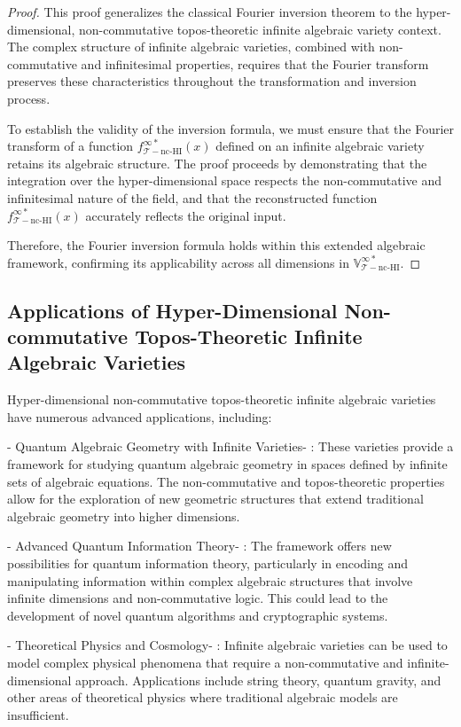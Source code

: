 \documentclass{article}
\begin{document}
\begin{proof}
This proof generalizes the classical Fourier inversion theorem to the hyper-dimensional, non-commutative topos-theoretic infinite algebraic variety context. The complex structure of infinite algebraic varieties, combined with non-commutative and infinitesimal properties, requires that the Fourier transform preserves these characteristics throughout the transformation and inversion process.

To establish the validity of the inversion formula, we must ensure that the Fourier transform of a function \(f_{\mathcal{T}-\text{nc-HI}}^{\infty *}(x)\) defined on an infinite algebraic variety retains its algebraic structure. The proof proceeds by demonstrating that the integration over the hyper-dimensional space respects the non-commutative and infinitesimal nature of the field, and that the reconstructed function \(f_{\mathcal{T}-\text{nc-HI}}^{\infty *}(x)\) accurately reflects the original input.

Therefore, the Fourier inversion formula holds within this extended algebraic framework, confirming its applicability across all dimensions in \(\mathbb{V}_{\mathcal{T}-\text{nc-HI}}^{\infty *}\).
\end{proof}

\subsection{Applications of Hyper-Dimensional Non-commutative Topos-Theoretic Infinite Algebraic Varieties}
Hyper-dimensional non-commutative topos-theoretic infinite algebraic varieties have numerous advanced applications, including:

-  Quantum Algebraic Geometry with Infinite Varieties- : These varieties provide a framework for studying quantum algebraic geometry in spaces defined by infinite sets of algebraic equations. The non-commutative and topos-theoretic properties allow for the exploration of new geometric structures that extend traditional algebraic geometry into higher dimensions.

-  Advanced Quantum Information Theory- : The framework offers new possibilities for quantum information theory, particularly in encoding and manipulating information within complex algebraic structures that involve infinite dimensions and non-commutative logic. This could lead to the development of novel quantum algorithms and cryptographic systems.

-  Theoretical Physics and Cosmology- : Infinite algebraic varieties can be used to model complex physical phenomena that require a non-commutative and infinite-dimensional approach. Applications include string theory, quantum gravity, and other areas of theoretical physics where traditional algebraic models are insufficient.
\end{document}
